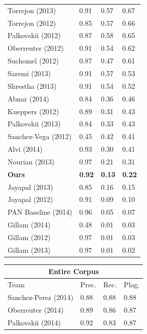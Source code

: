 \begin{table}[th]
\begin{tabularx}{.31\textwidth}{@{}l*{3}{X}}
Torrejon (2013)     &       0.91 &   0.57 &    0.67 \\ %
Torrejon (2012)     &       0.85 &   0.57 &    0.66 \\ %
Palkovskii (2012)   &       0.87 &   0.58 &    0.65 \\ %
Oberreuter (2012)   &       0.91 &   0.54 &    0.62 \\ %
Suchomel (2012)     &       0.87 &   0.47 &    0.61 \\ %
Saremi (2013)       &       0.91 &   0.57 &    0.53 \\
Shrestha (2013)     &       0.91 &   0.54 &    0.52 \\ %
Abnar (2014)        &       0.84 &   0.36 &    0.46 \\
Kueppers (2012)     &       0.89 &   0.31 &    0.43 \\
Palkovskii (2013)   &       0.84 &   0.33 &    0.43 \\ %
Sanchez-Vega (2012) &       0.45 &   0.42 &    0.41 \\
Alvi (2014)         &       0.93 &   0.30 &    0.41 \\
Nourian (2013)      &       0.97 &   0.21 &    0.31 \\
\textbf{Ours}       &       \textbf{0.92} &   \textbf{0.13} &    \textbf{0.22} \\
Jayapal (2013)      &       0.85 &   0.16 &    0.15 \\
Jayapal (2012)      &       0.91 &   0.09 &    0.10 \\ %
PAN Baseline (2014) &       0.96 &   0.05 &    0.07 \\
Gillam (2014)       &       0.48 &   0.01 &    0.03 \\
Gillam (2012)       &       0.97 &   0.01 &    0.03 \\ %
Gillam (2013)       &       0.97 &   0.01 &    0.02 \\ %
\bottomrule
\end{tabularx}
\hfill
\begin{tabularx}{.31\textwidth}{@{}l*{3}{X}}
\multicolumn{4}{c}{\bfseries Entire Corpus} \\
\toprule
Team                & Prec.     & Rec.   & Plag.   \\
\midrule
Sanchez-Perez (2014)&      0.88 &   0.88 &    0.88 \\
Oberreuter (2014)   &      0.89 &   0.86 &    0.87 \\
Palkovskii (2014)   &      0.92 &   0.83 &    0.87 \\

\end{tabularx}
\end{table}
